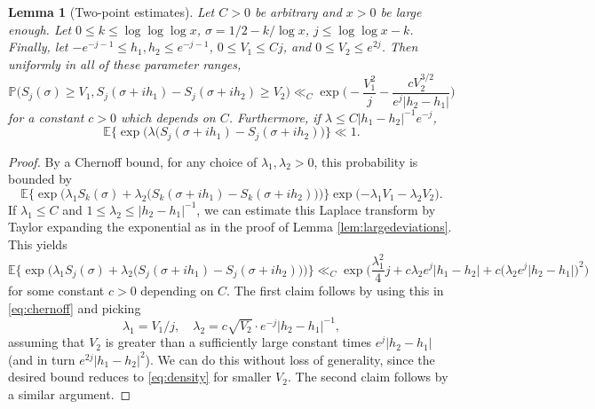 \documentclass{amsart}
\newtheorem{lemma}[theorem]{Lemma}
\theoremstyle{definition}
\theoremstyle{remark}
\numberwithin{equation}{section}
\begin{document}
\begin{lemma}[Two-point estimates]\label{lem:LD} Let $C>0$ be arbitrary and $x>0$ be large enough. Let $0\leq k\leq \log\log\log x$, $\sigma=1/2-k/\log x$, $j\leq \log\log x-k$. Finally, let $-e^{-j-1}\leq h_1,h_2\leq e^{-j-1}$, $0\leq V_1\leq Cj$, and $0\leq V_2\leq e^{2j}$. Then uniformly in all of these parameter ranges,
\[
     \mathbb{P}\big(S_j(\sigma)\geq V_1, S_{j}(\sigma+ih_1)-S_{j}(\sigma+ih_2)\geq V_2\big)\ll_C  \exp\Big(\!-\frac{V_1^2}{j}-\frac{cV_2^{3/2}}{e^{j}|h_2-h_1|}\Big)
\]
for a constant $c>0$ which depends on $C$. Furthermore, if $\lambda \leq C|h_1-h_2|^{-1}e^{-j}$,
\begin{equation}\label{eq:O1MGF}
        \mathbb{E}\big\{\!\exp\!\big(\lambda(S_j(\sigma+ih_1)-S_j(\sigma+ih_2)\big)\big\}\ll 1.
\end{equation}
\end{lemma}
\begin{proof}
    By a Chernoff bound, for any choice of $\lambda_1,\lambda_2>0$, this probability is bounded by
    \begin{equation}\label{eq:chernoff}
            \mathbb{E}\Big\{\!\exp\Big({\lambda_1 S_k(\sigma)+\lambda_2\big(S_k(\sigma+ih_1)-S_k(\sigma+ih_2)\big)}\Big)\Big\}\exp\big({-\lambda_1V_1-\lambda_2V_2}\big).
    \end{equation}
    If $\lambda_1\leq C$ and $1\leq \lambda_2\leq |h_2-h_1|^{-1}$, we can estimate this Laplace transform by Taylor expanding the exponential as in the proof of Lemma \ref{lem:largedeviations}. This yields 
    \begin{equation*}
                             \mathbb{E}\Big\{\!\exp\Big({\lambda_1 S_j(\sigma)+\lambda_2\big(S_j(\sigma+ih_1)-S_j(\sigma+ih_2)\big)}\Big)\Big\}\ll_C  \exp\bigg(\frac{\lambda_1^2}{4}j+c\lambda_2e^{j}|h_1-h_2|+c\big(\lambda_2e^j |h_2-h_1|\big)^2\bigg)
    \end{equation*}
    for some constant $c>0$ depending on $C$. The first claim follows by using this in \eqref{eq:chernoff} and picking
    \[
        \lambda_1= V_1/j, \quad \lambda_2= c\sqrt{V_2}\cdot e^{-j}|h_2-h_1|^{-1},
    \]
    assuming that $V_2$ is greater than a sufficiently large constant times $e^j|h_2-h_1|$ (and in turn $e^{2j}|h_1-h_2|^2$). We can do this without loss of generality, since the desired bound reduces to \eqref{eq:density} for smaller $V_2$. The second claim follows by a similar argument.
\end{proof}
\end{document}
